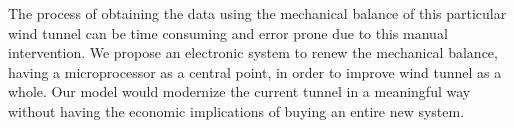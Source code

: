 		The process of obtaining the data using the mechanical balance of this particular wind tunnel 
		can be time consuming and error prone due to this manual intervention. We propose an electronic system 
		to renew the mechanical balance, having a microprocessor as a central point, in order to 
		improve wind tunnel as a whole. Our model would modernize the current tunnel in a 
		meaningful way without having the economic implications of buying an entire new system.
